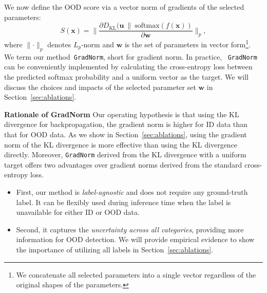 \documentclass{article}
\def\*#1{\mathbf{#1}}
\begin{document}
We now define the OOD score via a vector norm of gradients of the selected parameters:
\begin{equation}
\label{eq:score}
    S(\*x) = \lVert\frac{\partial D_\text{KL}(\*u~\lVert~\text{softmax}(f(\*x))}{\partial \*w}  \rVert_p,
\end{equation}
where $\lVert \cdot \rVert_p$ denotes $L_p$-norm and $\*w$ is the set of   parameters in vector form\footnote{We concatenate all selected parameters into a single vector regardless of the original shapes of the parameters.}. We term our method~\texttt{GradNorm}, short for gradient norm. In practice, ~\texttt{GradNorm} can be conveniently implemented by calculating the cross-entropy loss between the predicted softmax probability and a uniform vector as the target. We will discuss the choices and impacts of the selected parameter set $\*w$ in Section~\ref{sec:ablations}. 











\textbf{Rationale of {GradNorm}} Our operating hypothesis is that using the KL divergence for backpropagation, the gradient norm is higher for ID data than that for OOD data. As we show in Section~\ref{sec:ablations}, using the gradient norm of the KL divergence is more effective than using the KL divergence directly.
Moreover, \texttt{GradNorm} derived from the KL divergence with a uniform target offers two advantages over gradient norms derived from the standard cross-entropy loss.
\vspace{-0.2cm}
\begin{itemize}
\itemsep0em
    \item First, our method is \emph{label-agnostic} and does not require any ground-truth label. It can be flexibly used during inference time when the label is unavailable for either ID or OOD data. 
    \item  Second, it captures the \emph{uncertainty across all categories}, providing more information for OOD detection. We will provide empirical evidence to show the importance of utilizing all labels in Section~\ref{sec:ablations}.
\end{itemize}
\end{document}
